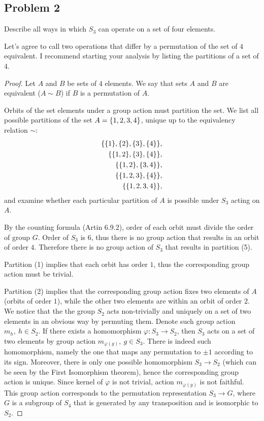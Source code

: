 \documentclass{article}
\theoremstyle{definition}
\DeclarePairedDelimiter\set{\{}{\}}
\begin{document}
\subsection*{Problem 2}

\begin{tcolorbox}
Describe all ways in which $S_3$ can operate on a set of four elements.

Let’s agree to call two operations that differ by a permutation of the set of $4$ equivalent.
I recommend starting your analysis by listing the partitions of a set of $4$.
\end{tcolorbox}

\begin{proof}

Let $A$ and $B$ be sets of $4$ elements.
We say that sets $A$ and $B$ are equivalent ($A \sim B$) if $B$ is a permutation of $A$.

Orbits of the set elements under a group action must partition the set.
We list all possible partitions of the set $A = \set{1,2,3,4}$, unique up to the equivalency relation $\sim$:
\begin{align}
    \set{ \set{1}, \set{2}, \set{3}, \set{4} }, \\
    \set{ \set{1,2}, \set{3}, \set{4} }, \\
    \set{ \set{1,2}, \set{3,4} }, \\
    \set{ \set{1,2,3}, \set{4} }, \\
    \set{ \set{1,2,3,4} },
\end{align}
and examine whether each particular partition of $A$ is possible under $S_3$ acting on $A$.

By the counting formula (Artin 6.9.2), order of each orbit must divide the order of group $G$.
Order of $S_3$ is $6$, thus there is no group action that results in an orbit of order $4$.
Therefore there is no group action of $S_3$ that results in partition (5).

Partition (1) implies that each orbit has order $1$, thus the corresponding group action must be trivial.

Partition (2) implies that the corresponding group action fixes two elements of $A$ (orbits of order $1$), while the other two elements are within an orbit of order $2$.
We notice that the the group $S_2$ acts non-trivially and uniquely on a set of two elements in an obvious way by permuting them.
Denote such group action $m_h, \> h \in S_2$.
If there exists a homomorphism $\varphi : S_3 \to S_2$, then $S_3$ acts on a set of two elements by group action $m_{\varphi(g)}, \> g \in S_3$.
There is indeed such homomorphism, namely the one that maps any permutation to $\pm 1$ according to its sign.
Moreover, there is only one possible homomorphism $S_3 \to S_2$ (which can be seen by the First Isomorphism theorem), hence the corresponding group action is unique.
Since kernel of $\varphi$ is not trivial, action $m_{\varphi(g)}$ is not faithful.
This group action corresponds to the permutation representation $S_3 \to G$, where $G$ is a subgroup of $S_4$ that is generated by any transposition and is isomorphic to $S_2$.


\end{proof}
\end{document}

